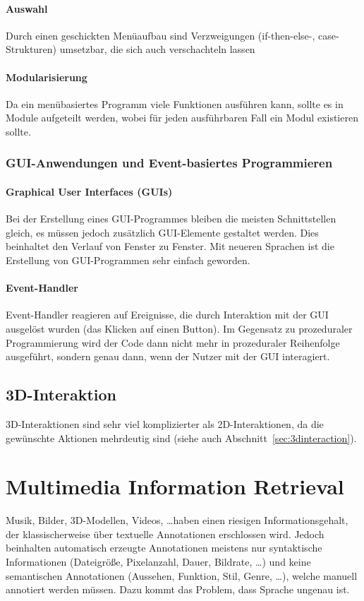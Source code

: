 			\subsubsection{Auswahl}
				Durch einen geschickten Menüaufbau sind Verzweigungen (if-then-else-, case-Strukturen) umsetzbar, die sich auch verschachteln lassen

			\subsubsection{Modularisierung}
				Da ein menübasiertes Programm viele Funktionen ausführen kann, sollte es in Module aufgeteilt werden, wobei für jeden ausführbaren Fall ein Modul existieren sollte.

		\subsection{GUI-Anwendungen und Event-basiertes Programmieren}
			\subsubsection{Graphical User Interfaces (GUIs)}
				Bei der Erstellung eines GUI-Programmes bleiben die meisten Schnittstellen gleich, es müssen jedoch zusätzlich GUI-Elemente gestaltet werden. Dies beinhaltet den Verlauf von Fenster zu Fenster. Mit neueren Sprachen ist die Erstellung von GUI-Programmen sehr einfach geworden.

			\subsubsection{Event-Handler}
				Event-Handler reagieren auf Ereignisse, die durch Interaktion mit der GUI ausgelöst wurden (\zB das Klicken auf einen Button). Im Gegensatz zu prozeduraler Programmierung wird der Code dann nicht mehr in prozeduraler Reihenfolge ausgeführt, sondern genau dann, wenn der Nutzer mit der GUI interagiert.

	\section{3D-Interaktion}
		3D-Interaktionen sind sehr viel komplizierter als 2D-Interaktionen, da die gewünschte Aktionen mehrdeutig sind (siehe auch Abschnitt~\ref{sec:3dinteraction}).

\chapter{Multimedia Information Retrieval}
	Musik, Bilder, 3D-Modellen, Videos, \dots haben einen riesigen Informationsgehalt, der klassischerweise über textuelle Annotationen erschlossen wird. Jedoch beinhalten automatisch erzeugte Annotationen meistens nur syntaktische Informationen (Dateigröße, Pixelanzahl, Dauer, Bildrate, \dots) und keine semantischen Annotationen (Aussehen, Funktion, Stil, Genre, \dots), welche manuell annotiert werden müssen. Dazu kommt das Problem, dass Sprache \iA ungenau ist.

